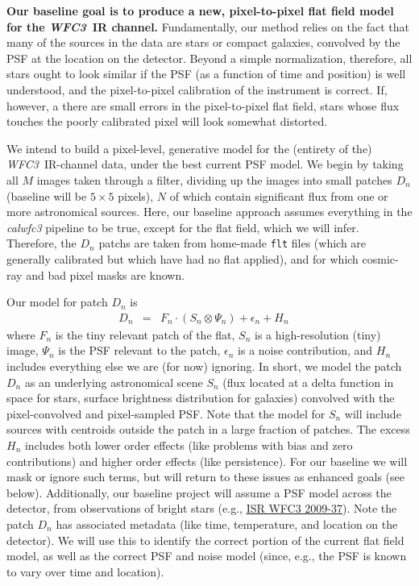 \documentclass[12pt]{article}
\newcommand{\project}[1]{\textsl{#1}}
\newcommand{\WFC}{\project{WFC3}}
\begin{document}
\textbf{Our baseline goal is to produce a new, pixel-to-pixel
  flat field model for the \WFC\ IR channel.}
Fundamentally, our method relies on the fact
that many of the sources in the data are stars or compact galaxies, convolved by the PSF at
the location on the detector.  Beyond a simple normalization,
therefore, all stars ought to look similar if the PSF (as a
function of time and position) is well understood, and the
pixel-to-pixel calibration of the instrument is correct.  If, however,
a there are small errors in the pixel-to-pixel flat field, stars whose flux
touches the poorly calibrated pixel will look somewhat distorted.

We intend to build a pixel-level, generative model
for the (entirety of the) \WFC\ IR-channel data, under the best current PSF model.  We begin by
taking all $M$ images taken through a filter, dividing up the images into
small patches $D_n$ (baseline will be $5 \times 5$ pixels), $N$ of which contain
significant flux from one or more astronomical sources.  Here, our baseline approach assumes
everything in the \textsl{calwfc3} pipeline to be true, except for the
flat field, which we will infer.  Therefore, the $D_n$ patchs are taken
from home-made \texttt{flt} files (which are generally calibrated but which have had no flat applied), and for
which cosmic-ray and bad pixel masks are known.

Our model for patch $D_n$ is
\begin{eqnarray}
D_n & = & F_n \cdot (S_n \otimes \Psi_n) + \epsilon_n + H_n
\quad 
\end{eqnarray}
where $F_n$ is the tiny relevant patch of the flat, $S_n$ is a high-resolution (tiny) image, $\Psi_n$
is the PSF relevant to the patch, $\epsilon_n$ is a noise
contribution, and $H_n$ includes everything else we are (for now) ignoring.
In short, we model the patch $D_n$ as an underlying astronomical scene
$S_n$ (flux located at a delta function in space for stars, surface
brightness distribution for galaxies) convolved with the
pixel-convolved and pixel-sampled PSF.  Note that the model for $S_n$
will include sources with centroids outside the patch in a large
fraction of patches.  The excess $H_n$ includes both lower order
effects (like problems with bias and zero contributions) and higher order effects
(like persistence).  For our baseline we will mask or ignore such
terms, but will return to these issues as enhanced goals (see below).
Additionally, our baseline project will assume a PSF model across the
detector, from observations of bright stars (e.g.,
\href{http://bit.ly/XFSb1M}{ISR WFC3 2009-37}).  Note the patch $D_n$
has associated metadata (like time, temperature, and location on the
detector).  We will use this to identify the correct portion of the
current flat field model, as well as the correct PSF and noise model
(since, e.g., the PSF is known to vary over time and location).
\end{document}
